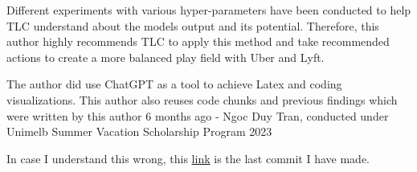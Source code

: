 \documentclass[11pt]{article}
\begin{document}
Different experiments with various hyper-parameters have been conducted to help TLC understand about the models output and its potential. Therefore, this author highly recommends TLC to apply this method and take recommended actions to create a more balanced play field with Uber and Lyft.

\clearpage

 
\printbibliography
The author did use ChatGPT as a tool to achieve Latex and coding visualizations. This author also reuses code chunks and previous findings which were written by this author 6 months ago - Ngoc Duy Tran, conducted under Unimelb Summer Vacation Scholarship Program 2023 \cite{Tran-NBeats}

In case I understand this wrong, this \href{https://github.com/MAST30034-Applied-Data-Science/mast30034-project-1-dduygaucho/commit/2d0d9dfe737095fb0cace2f3949178cdd8c97f89}{link} is the last commit I have made.
\end{document}
